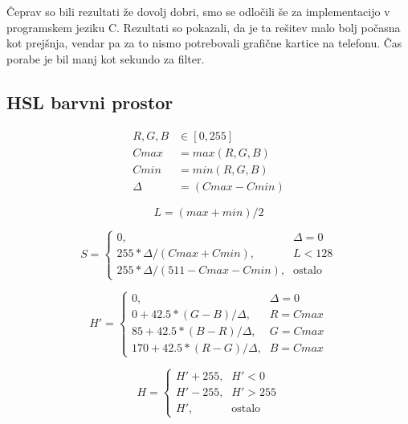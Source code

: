 Čeprav so bili rezultati že dovolj dobri, smo se odločili še za implementacijo
v programskem jeziku C. Rezultati so pokazali, da je ta rešitev malo bolj
počasna kot prejšnja, vendar pa za to nismo potrebovali grafične kartice na
telefonu. Čas porabe je bil manj kot sekundo za filter.

\subsection{HSL barvni prostor}
\label{sec:hsl}

\begin{align}
R, G, B &\in [0,255] \nonumber \\
Cmax &= max(R, G, B) \\
Cmin &= min(R, G, B) \\
\Delta &= (Cmax - Cmin)
\end{align}

\begin{equation}
L = (max + min) / 2 \label{eq:hsl_l}
\end{equation}

\begin{equation}
S =
\begin{cases}
    0 \text{,}& \Delta = 0 \\
    255 * \Delta / (Cmax + Cmin) \text{,}& L < 128 \\
    255 * \Delta / (511 - Cmax - Cmin) \text{,}& \text{ostalo}
\end{cases}
\end{equation}

\begin{equation}
H' =
\begin{cases}
    0 \text{,}& \Delta = 0 \\
    0 + 42.5 * (G - B) / \Delta \text{,}& R = Cmax \\
    85 + 42.5 * (B - R) / \Delta \text{,}& G = Cmax \\
    170 + 42.5 * (R - G) / \Delta \text{,}& B = Cmax
\end{cases}
\end{equation}

\begin{equation}
H =
\begin{cases}
    H' + 255 \text{,}& H' < 0 \\
    H' - 255 \text{,}& H' > 255 \\
    H' \text{,}& \text{ostalo}
\end{cases}
\end{equation}

